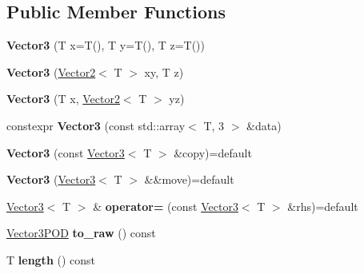 \subsection*{Public Member Functions}
\begin{DoxyCompactItemize}
\item 
\mbox{\label{class_vector3_adbe669edb8e99e52f2977d90216240d6}} 
{\bfseries Vector3} (T x=T(), T y=T(), T z=T())
\item 
\mbox{\label{class_vector3_afcc8c0d5ab04576a5d1dac5cfe26ac5a}} 
{\bfseries Vector3} (\mbox{\hyperlink{class_vector2}{Vector2}}$<$ T $>$ xy, T z)
\item 
\mbox{\label{class_vector3_a418527eee55cb85c7482d1e381f1034e}} 
{\bfseries Vector3} (T x, \mbox{\hyperlink{class_vector2}{Vector2}}$<$ T $>$ yz)
\item 
\mbox{\label{class_vector3_a071a8ad60a3a8ab6e07b868c5c5fd617}} 
constexpr {\bfseries Vector3} (const std\+::array$<$ T, 3 $>$ \&data)
\item 
\mbox{\label{class_vector3_a0f1bc2fd756831c7c76cfb53818cd4b9}} 
{\bfseries Vector3} (const \mbox{\hyperlink{class_vector3}{Vector3}}$<$ T $>$ \&copy)=default
\item 
\mbox{\label{class_vector3_acf8f012882baca43b4c45f14dab5fae6}} 
{\bfseries Vector3} (\mbox{\hyperlink{class_vector3}{Vector3}}$<$ T $>$ \&\&move)=default
\item 
\mbox{\label{class_vector3_a6c79f9f930582d7368e025e771ae7636}} 
\mbox{\hyperlink{class_vector3}{Vector3}}$<$ T $>$ \& {\bfseries operator=} (const \mbox{\hyperlink{class_vector3}{Vector3}}$<$ T $>$ \&rhs)=default
\item 
\mbox{\label{class_vector3_a9bc4a07b903235d5a0c81eeb75e856e0}} 
\mbox{\hyperlink{struct_vector3_p_o_d}{Vector3\+P\+OD}} {\bfseries to\+\_\+raw} () const
\item 
\mbox{\label{class_vector3_aa5177b38edaae3717bc94443946345d0}} 
T {\bfseries length} () const
\item 
\mbox{\label{class_vector3_abf12b7769b13982490e594877236abe1}} 

\end{DoxyCompactItemize}
